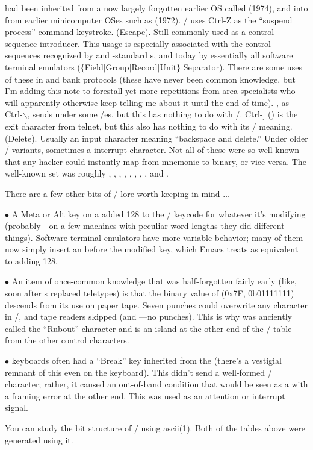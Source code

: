 had been inherited from a now largely forgotten earlier OS called  (1974),
and into  from earlier  minicomputer OSes such as  (1972). \UNIX/
uses Ctrl-Z as the ``suspend process'' command keystroke.
\dlist {} (Escape).
Still commonly used as a control-sequence introducer. This usage is especially
associated with the control sequences recognized by  and -standard
s, and today by essentially all software terminal emulators
\dlist {} ($\lbrace$Field$\vert$Group$\vert$Record$\vert$Unit$\rbrace$ Separator).
There are some uses of these in  and bank protocols (these have never been
common knowledge, but I'm adding this note to forestall yet more repetitions
from area specialists who will apparently otherwise keep telling me about it
until the end of time). , as Ctrl-$\backslash$, sends  under some
\UNIX/es, but this has nothing to do with \ASCII/. Ctrl-] () is the exit
character from telnet, but this also has nothing to do with its \ASCII/ meaning.
\dlist {} (Delete).
Usually an input character meaning ``backspace and delete.'' Under older \UNIX/
variants, sometimes a  interrupt character.
\medbreak
\noindent Not all of these were so well known that any hacker could instantly
map from mnemonic to binary, or vice-versa. The well-known set was roughly ,
, , , , , , , and .

There are a few other bits of \ASCII/ lore worth keeping in mind $\ldots$
{\medbreak\narrower
\item{$\bullet$} A Meta or Alt key on a  added 128 to the \ASCII/ keycode for
whatever it's modifying (probably---on a few machines with peculiar word
lengths they did different things). Software terminal emulators have more
variable behavior; many of them now simply insert an  before the modified
key, which Emacs treats as equivalent to adding 128.

\item{$\bullet$} An item of once-common knowledge that was half-forgotten fairly early (like,
soon after s replaced teletypes) is that the binary value of  (0x7F,
0b01111111) descends from its use on paper tape. Seven punches could overwrite
any character in \ASCII/, and tape readers skipped  (and ---no punches).
This is why  was anciently called the ``Rubout'' character and is an island at
the other end of the \ASCII/ table from the other control characters.

\item{$\bullet$}  keyboards often had a ``Break'' key inherited from the  (there's a
vestigial remnant of this even on the  keyboard). This didn't send a
well-formed \ASCII/ character; rather, it caused an out-of-band condition that
would be seen as a  with a framing error at the other end. This was used as
an attention or interrupt signal.
\medbreak}
\noindent You can study the bit structure of \ASCII/ using ascii(1). Both of the tables
above were generated using it.


